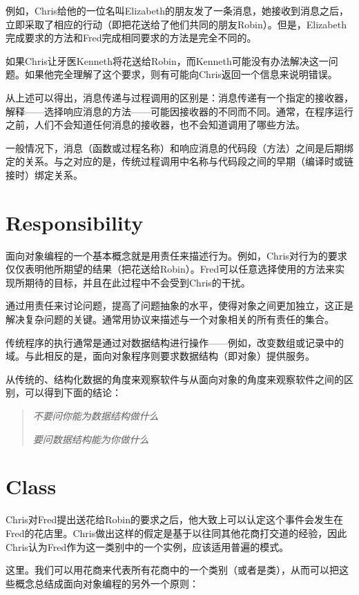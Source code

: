 例如，Chris给他的一位名叫Elizabeth的朋友发了一条消息，她接收到消息之后，立即采取了相应的行动（即把花送给了他们共同的朋友Robin）。但是，Elizabeth完成要求的方法和Fred完成相同要求的方法是完全不同的。

如果Chris让牙医Kenneth将花送给Robin，而Kenneth可能没有办法解决这一问题。如果他完全理解了这个要求，则有可能向Chris返回一个信息来说明错误。

从上述可以得出，消息传递与过程调用的区别是：消息传递有一个指定的接收器，解释——选择响应消息的方法——可能因接收器的不同而不同。通常，在程序运行之前，人们不会知道任何消息的接收器，也不会知道调用了哪些方法。

一般情况下，消息（函数或过程名称）和响应消息的代码段（方法）之间是后期绑定的关系。与之对应的是，传统过程调用中名称与代码段之间的早期（编译时或链接时）绑定关系。

\section{Responsibility}


面向对象编程的一个基本概念就是用责任来描述行为。例如，Chris对行为的要求仅仅表明他所期望的结果（把花送给Robin）。Fred可以任意选择使用的方法来实现所期待的目标，并且在此过程中不会受到Chris的干扰。

通过用责任来讨论问题，提高了问题抽象的水平，使得对象之间更加独立，这正是解决复杂问题的关键。通常用协议来描述与一个对象相关的所有责任的集合。

传统程序的执行通常是通过对数据结构进行操作——例如，改变数组或记录中的域。与此相反的是，面向对象程序则要求数据结构（即对象）提供服务。


从传统的、结构化数据的角度来观察软件与从面向对象的角度来观察软件之间的区别，可以得到下面的结论：

\begin{quote}
\emph{不要问你能为数据结构做什么}

\emph{要问数据结构能为你做什么}
\end{quote}

\section{Class}

Chris对Fred提出送花给Robin的要求之后，他大致上可以认定这个事件会发生在Fred的花店里。Chris做出这样的假定是基于以往同其他花商打交道的经验，因此Chris认为Fred作为这一类别中的一个实例，应该适用普遍的模式。

这里。我们可以用花商来代表所有花商中的一个类别（或者是类），从而可以把这些概念总结成面向对象编程的另外一个原则：

